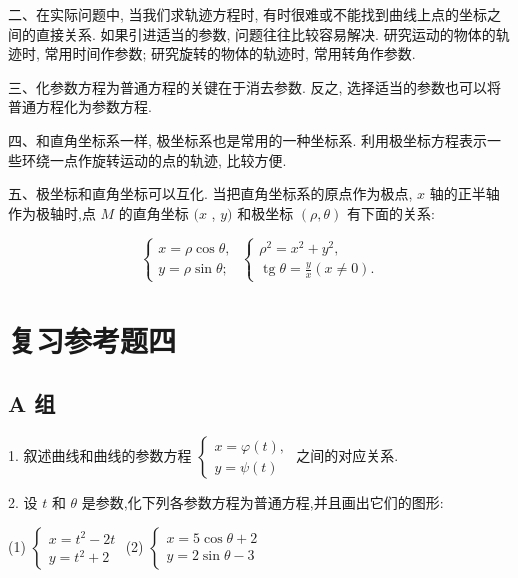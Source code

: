 \documentclass[lang=cn,newtx,10.5pt,scheme=chinese]{elegantbook}
\begin{document}
二、在实际问题中, 当我们求轨迹方程时, 有时很难或不能找到曲线上点的坐标之间的直接关系. 如果引进适当的参数, 问题往往比较容易解决. 研究运动的物体的轨迹时, 常用时间作参数; 研究旋转的物体的轨迹时, 常用转角作参数.

三、化参数方程为普通方程的关键在于消去参数. 反之, 选择适当的参数也可以将普通方程化为参数方程.

四、和直角坐标系一样, 极坐标系也是常用的一种坐标系. 利用极坐标方程表示一些环绕一点作旋转运动的点的轨迹, 比较方便.

五、极坐标和直角坐标可以互化. 当把直角坐标系的原点作为极点, \(x\) 轴的正半轴作为极轴时,点 \(M\) 的直角坐标 \((x\) , \(y)\) 和极坐标 \(\left( {\rho ,\theta }\right)\) 有下面的关系:

\[
  \left\{ {\begin{array}{l} x = \rho \cos \theta , \\ y = \rho \sin \theta ; \end{array}\;\left\{ \begin{array}{l} {\rho }^{2} = {x}^{2} + {y}^{2}, \\ \operatorname{tg}\theta = \frac{y}{x}\left( {x \neq 0}\right) . \end{array}\right. }\right.
\]

\chapter*{复习参考题四}

\section*{A 组}

1. 叙述曲线和曲线的参数方程 \(\left\{ \begin{array}{l} x = \varphi \left( t\right) , \\ y = \psi \left( t\right) \end{array}\right.\) 之间的对应关系.

2. 设 \(t\) 和 \(\theta\) 是参数,化下列各参数方程为普通方程,并且画出它们的图形:

(1) \(\left\{ \begin{array}{l} x = {t}^{2} - {2t} \\ y = {t}^{2} + 2 \end{array}\right.\) (2) \(\left\{ \begin{array}{l} x = 5\cos \theta + 2 \\ y = 2\sin \theta - 3 \end{array}\right.\)
\end{document}
